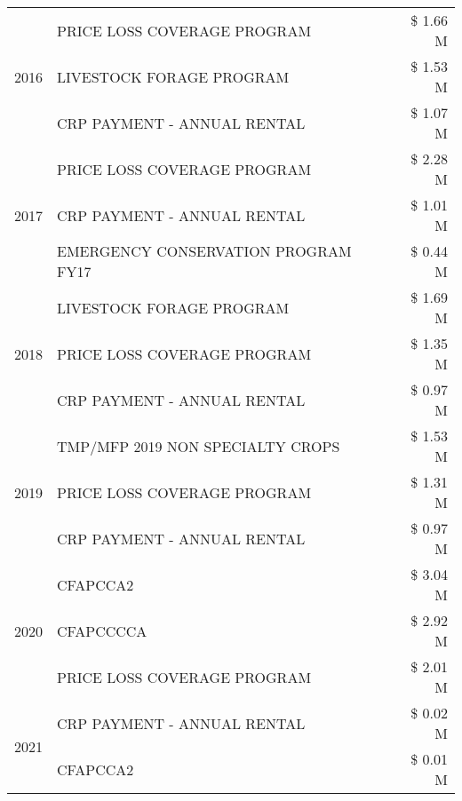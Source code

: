 \begin{tabular}{llr}
\cline{1-3}
\multirow[t]{3}{*}{2016} & PRICE LOSS COVERAGE PROGRAM & \$ 1.66 M \\
 & LIVESTOCK FORAGE PROGRAM & \$ 1.53 M \\
 & CRP PAYMENT - ANNUAL RENTAL & \$ 1.07 M \\
\cline{1-3}
\multirow[t]{3}{*}{2017} & PRICE LOSS COVERAGE PROGRAM & \$ 2.28 M \\
 & CRP PAYMENT - ANNUAL RENTAL & \$ 1.01 M \\
 & EMERGENCY CONSERVATION PROGRAM FY17 & \$ 0.44 M \\
\cline{1-3}
\multirow[t]{3}{*}{2018} & LIVESTOCK FORAGE PROGRAM & \$ 1.69 M \\
 & PRICE LOSS COVERAGE PROGRAM & \$ 1.35 M \\
 & CRP PAYMENT - ANNUAL RENTAL & \$ 0.97 M \\
\cline{1-3}
\multirow[t]{3}{*}{2019} & TMP/MFP 2019 NON SPECIALTY CROPS & \$ 1.53 M \\
 & PRICE LOSS COVERAGE PROGRAM & \$ 1.31 M \\
 & CRP PAYMENT - ANNUAL RENTAL & \$ 0.97 M \\
\cline{1-3}
\multirow[t]{3}{*}{2020} & CFAPCCA2 & \$ 3.04 M \\
 & CFAPCCCCA & \$ 2.92 M \\
 & PRICE LOSS COVERAGE PROGRAM & \$ 2.01 M \\
\cline{1-3}
\multirow[t]{2}{*}{2021} & CRP PAYMENT - ANNUAL RENTAL & \$ 0.02 M \\
 & CFAPCCA2 & \$ 0.01 M \\
\cline{1-3}
\bottomrule
\end{tabular}
